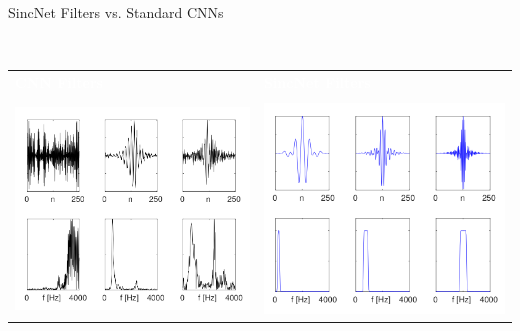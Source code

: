 \documentclass[11pt]{beamer}
\begin{document}
\begin{frame}{SincNet Filters vs. Standard CNNs}
	\begin{block}{~\vspace{0.7cm}}
		\begin{center}
			\vspace{-0.8cm}
			\begin{tabular}{p{0.45\textwidth}|p{}}
				\textcolor{white}{\bf CNN Filters} & \textcolor{white}{\bf SincNet Filters} \\\\
				\includegraphics[width=1\linewidth]{images/cnn_filters.png} & \includegraphics[width=1\linewidth]{images/sincnet_filters.png}\\
			\end{tabular}
		\end{center}
	\end{block}
\end{frame}
\end{document}
